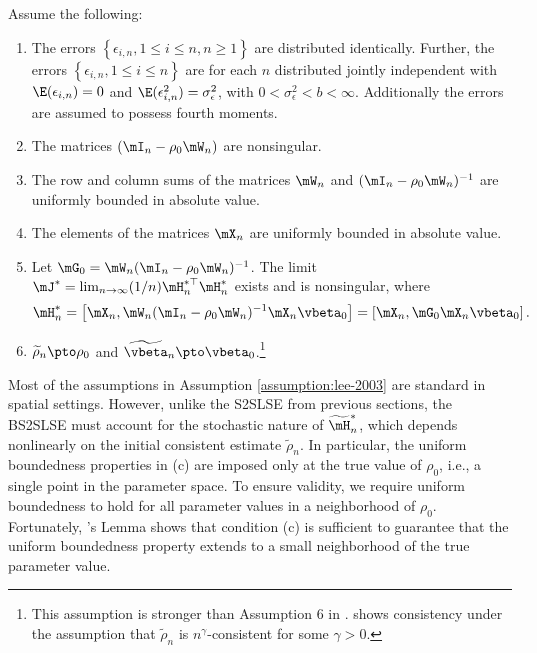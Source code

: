 \documentclass[english,12pt]{book}\usepackage[]{graphicx}\usepackage[]{xcolor}
\begin{document}
\begin{assumption}\label{assumption:lee-2003}
Assume the following:
\begin{enumerate}
\item The errors  $\left\lbrace \epsilon_{i,n}, 1 \leq i \leq n, n\geq 1\right\rbrace$ are distributed identically. Further, the errors $\left\lbrace \epsilon_{i,n}, 1 \leq i \leq n\right\rbrace$ are for each $n$ distributed jointly independent with  $\E(\epsilon_{i,n})= 0$ and $\E(\epsilon_{i,n}^2) = \sigma^2_{\epsilon}$, with $0 < \sigma^2_{\epsilon}  < b <\infty$. Additionally the errors are assumed to possess fourth moments.
  \item The matrices $(\mI_n - \rho_0\mW_n)$ are nonsingular. 
  \item The row and column sums of the matrices $\mW_n$ and $(\mI_n - \rho_0\mW_n)^{-1}$ are uniformly bounded in absolute value. 
  \item The elements of the matrices $\mX_n$ are uniformly bounded in absolute value. 
  \item Let $\mG_0 = \mW_n(\mI_n - \rho_0\mW_n)^{-1}$. The limit $\mJ^* = \lim_{n \to \infty}(1/n)\mH_n^{*\top}\mH_n^{*}$ exists and is nonsingular, where
  \begin{equation*}
    \mH_n^* = \left[\mX_n, \mW_n(\mI_n - \rho_0\mW_n)^{-1}\mX_n\vbeta_0\right] = \left[\mX_n, \mG_0\mX_n\vbeta_0\right].
  \end{equation*}
  \item $\widetilde{\rho}_n\pto \rho_0$ and $\widetilde{\vbeta}_n \pto \vbeta_0$.\footnote{This assumption is stronger than Assumption 6 in \cite{lee2003best}. \cite{lee2003best} shows consistency under the assumption that $\widetilde{\rho}_n$ is $n^\gamma$-consistent for some $\gamma>0$.}
\end{enumerate}  
\end{assumption}

Most of the assumptions in Assumption \ref{assumption:lee-2003} are standard in spatial settings. However, unlike the S2SLSE from previous sections, the BS2SLSE must account for the stochastic nature of $\widetilde{\mH}^{*}_n$, which depends nonlinearly on the initial consistent estimate $\widetilde{\rho}_n$. In particular, the uniform boundedness properties in (c) are imposed only at the true value of $\rho_0$, i.e., a single point in the parameter space. To ensure validity, we require uniform boundedness to hold for all parameter values in a neighborhood of $\rho_0$. Fortunately, \citet[pag. 313][]{lee2003best}'s Lemma shows that condition (c) is sufficient to guarantee that the uniform boundedness property extends to a small neighborhood of the true parameter value. 
\end{document}
